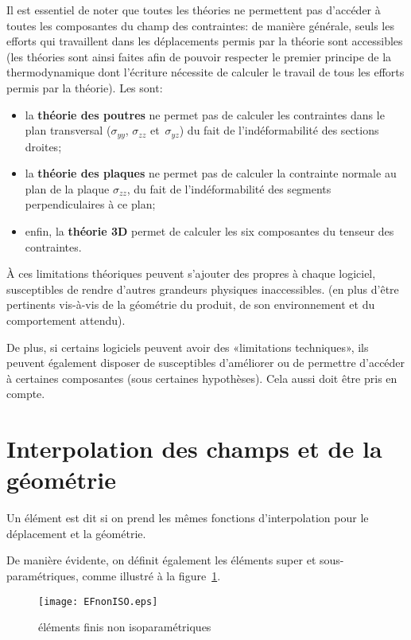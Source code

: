 \medskip
Il est essentiel de noter que toutes les théories ne permettent pas d'accéder à toutes les composantes du champ des contraintes: de manière générale, seuls les efforts qui travaillent dans les déplacements permis par la théorie sont accessibles (les théories sont ainsi faites afin de pouvoir respecter le premier principe de la thermodynamique dont l'écriture nécessite de calculer le travail de tous les efforts permis par la théorie). Les  sont:
\begin{itemize}
  \item la \textbf{théorie des poutres} ne permet pas de calculer les contraintes dans le plan transversal ($\sigma_{yy}$, $\sigma_{zz}$ et~$\sigma_{yz}$) du fait de l'indéformabilité des sections droites;
  \item la \textbf{théorie des plaques} ne permet pas de calculer la contrainte normale au plan de la plaque $\sigma_{zz}$, du fait de l'indéformabilité des segments perpendiculaires à ce plan;
  \item enfin, la \textbf{théorie 3D} permet de calculer les six composantes du tenseur des contraintes.
\end{itemize}

\medskip
À ces limitations théoriques peuvent s'ajouter des  propres à chaque logiciel, susceptibles de rendre d'autres grandeurs physiques inaccessibles.  (en plus d'être pertinents vis-à-vis de la géométrie du produit, de son environnement et du comportement attendu).

De plus, si certains logiciels peuvent avoir des «limitations techniques», ils peuvent également disposer de  susceptibles d'améliorer ou de permettre d'accéder à certaines composantes (sous certaines hypothèses). Cela aussi doit être pris en compte.


\medskip
\section{Interpolation des champs et de la géométrie}

Un élément est dit  si on prend les mêmes fonctions d'interpolation pour le déplacement et la géométrie.

De manière évidente, on définit également les éléments super et sous-paramétriques, comme illustré à la figure~\ref{EFnonISO}.
\begin{figure}[ht]
\centering
\texttt{[image: EFnonISO.eps]}
\caption{\label{EFnonISO} éléments finis non isoparamétriques}
\end{figure}

